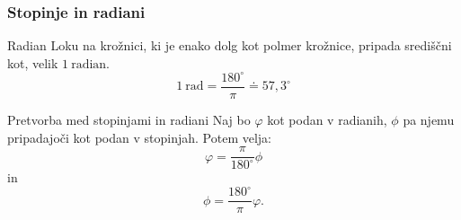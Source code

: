         
        \begin{frame}
            \frametitle{Stopinje in radiani}

            \begin{alertblock}{Radian}
                Loku na krožnici, ki je enako dolg kot polmer krožnice, pripada središčni kot, velik $1 \ \textrm{radian}$.
                $$ 1 \ \textrm{rad}=\frac{180^\circ}{\pi}\doteq 57,3^\circ$$
            \end{alertblock}

            \begin{exampleblock}{Pretvorba med stopinjami in radiani}
                Naj bo $\varphi$ kot podan v radianih, $\phi$ pa njemu pripadajoči kot podan v stopinjah. Potem velja:
                $$ \varphi = \frac{\pi}{180^\circ}\phi$$
                in 
                $$ \phi = \frac{180^\circ}{\pi} \varphi.$$
            \end{exampleblock}
        \end{frame}



